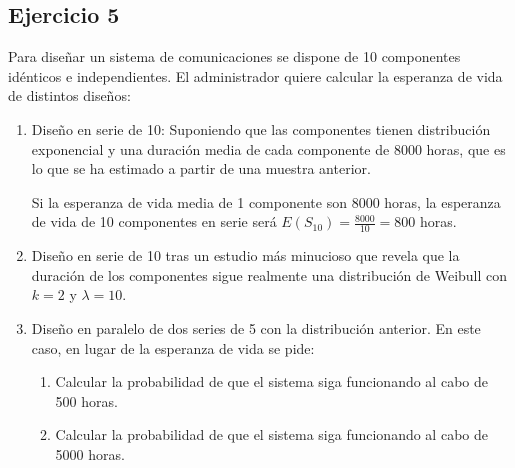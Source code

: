 \subsection{Ejercicio 5}
Para diseñar un sistema de comunicaciones se dispone de 10 componentes idénticos e independientes. El administrador quiere calcular la esperanza de vida de distintos diseños:
\begin{enumerate}
    \item Diseño en serie de 10: Suponiendo que las componentes tienen distribución exponencial y una duración media de cada componente de 8000 horas, que es lo que se ha estimado a partir de una muestra anterior.
    \begin{tcolorbox}[colback=white,colframe=cyan!50!black,fonttitle=\bfseries]
    Si la esperanza de vida media de 1 componente son 8000 horas, la esperanza de vida de 10 componentes en serie será $E(S_{10})=\frac{8000}{10}=800$ horas.
    \end{tcolorbox}
    \item Diseño en serie de 10 tras un estudio más minucioso que revela que la duración  de los componentes sigue realmente una distribución de Weibull con $k=2$ y $\lambda=10$.
    \begin{tcolorbox}[colback=white,colframe=cyan!50!black,fonttitle=\bfseries]

    \end{tcolorbox}
    \item Diseño en paralelo de dos series de 5 con la distribución anterior. En  este  caso, en lugar de la esperanza de vida se pide:
    \begin{enumerate}
        \item Calcular la probabilidad de que el sistema siga funcionando al cabo de 500 horas.
        \item Calcular la probabilidad de que el sistema siga funcionando al cabo de 5000 horas.
    \end{enumerate}
    \begin{tcolorbox}[colback=white,colframe=cyan!50!black,fonttitle=\bfseries]

    \end{tcolorbox}
\end{enumerate}
